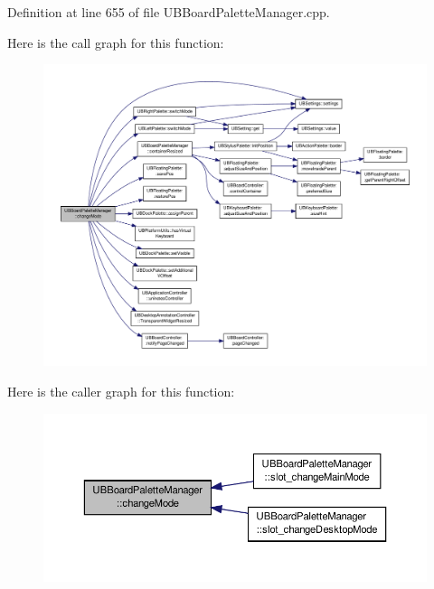 Definition at line 655 of file U\-B\-Board\-Palette\-Manager.\-cpp.



Here is the call graph for this function\-:
\nopagebreak
\begin{figure}[H]
\begin{center}
\leavevmode
\includegraphics[width=350pt]{dc/d38/class_u_b_board_palette_manager_a0fb81635b0f7c6afdcd982d61b9acc66_cgraph}
\end{center}
\end{figure}




Here is the caller graph for this function\-:
\nopagebreak
\begin{figure}[H]
\begin{center}
\leavevmode
\includegraphics[width=350pt]{dc/d38/class_u_b_board_palette_manager_a0fb81635b0f7c6afdcd982d61b9acc66_icgraph}
\end{center}
\end{figure}


